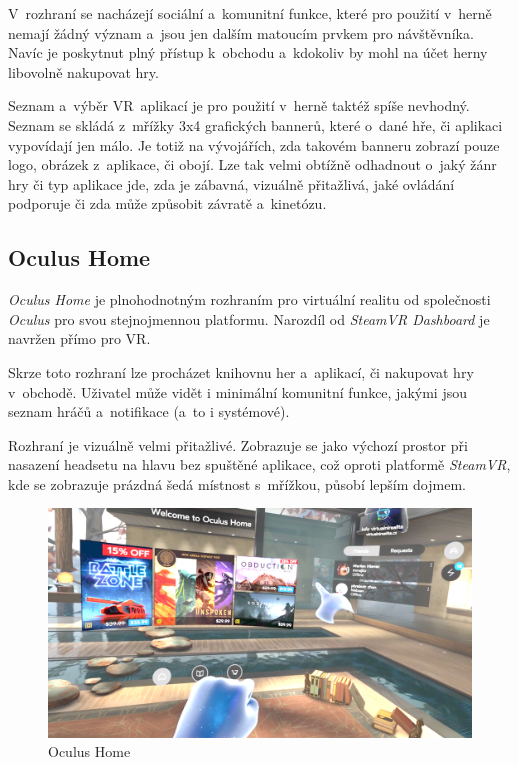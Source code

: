 V~rozhraní se nacházejí
sociální a~komunitní funkce, které pro použití v~herně nemají žádný
význam a~jsou jen dalším matoucím prvkem pro návštěvníka. Navíc je poskytnut
plný přístup k~obchodu a~kdokoliv by mohl na účet herny libovolně
nakupovat hry.

Seznam a~výběr VR~aplikací je pro použití v~herně taktéž spíše nevhodný.
Seznam se skládá z~mřížky 3x4 grafických bannerů, které o~dané hře, či aplikaci 
vypovídají jen málo. Je totiž na vývojářích, zda takovém banneru
zobrazí pouze logo, obrázek z~aplikace, či obojí. Lze tak velmi obtížně
odhadnout o~jaký žánr hry či typ aplikace jde, zda je zábavná, vizuálně přitažlivá, jaké
ovládání podporuje či zda může způsobit závratě a~kinetózu.

\subsection{Oculus Home}\label{oculus-home}

\emph{Oculus Home} je plnohodnotným rozhraním pro virtuální realitu od
společnosti \emph{Oculus} pro svou stejnojmennou platformu. Narozdíl od
\emph{SteamVR Dashboard} je navržen přímo pro VR.

Skrze toto rozhraní lze procházet knihovnu her a~aplikací, či nakupovat hry
v~obchodě. Uživatel může vidět i minimální komunitní funkce, jakými jsou
seznam hráčů a~notifikace (a~to i systémové).

Rozhraní je vizuálně velmi přitažlivé. Zobrazuje se jako výchozí prostor
při nasazení headsetu na hlavu bez spuštěné aplikace, což oproti platformě
\emph{SteamVR}, kde se zobrazuje prázdná šedá místnost s~mřížkou, působí lepším
dojmem.

\begin{figure}[h!]
\centering
\includegraphics[width=12cm]{src/assets/oculus-home.png}
\caption{Oculus Home}
\end{figure}

